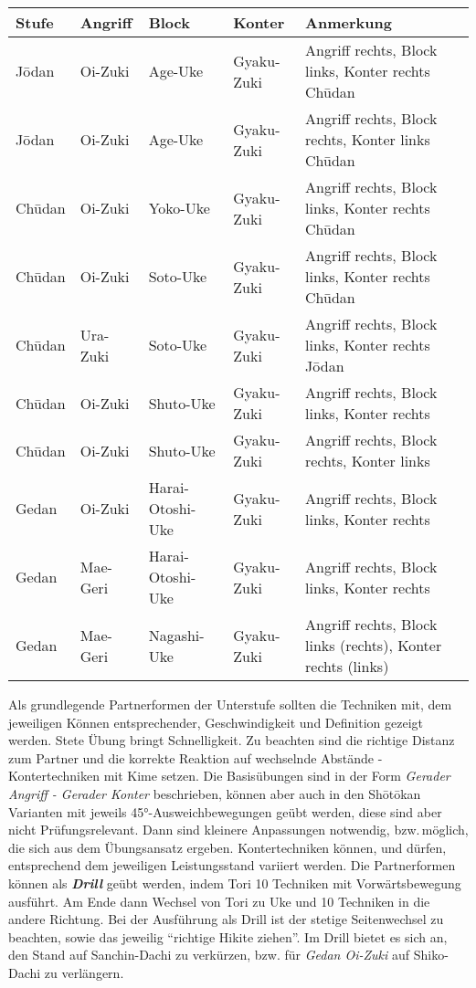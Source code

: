 	\null\vfill\null
	{\small 	\begin{tabularx}{\textwidth}{llllX}
			\textbf{Stufe} 	& \textbf{Angriff} 	& \textbf{Block}&\textbf{Konter}&Anmerkung\\
			\midrule
			J\={o}dan 	& Oi-Zuki 	& Age-Uke			&Gyaku-Zuki	& Angriff rechts, Block links, Konter rechts Ch\={u}dan \\
			J\={o}dan 	& Oi-Zuki 	& Age-Uke			&Gyaku-Zuki	& Angriff rechts, Block rechts, Konter links Ch\={u}dan \\	
			Ch\={u}dan	& Oi-Zuki	& Yoko-Uke			&Gyaku-Zuki	& Angriff rechts, Block links, Konter rechts Ch\={u}dan \\
			Ch\={u}dan	& Oi-Zuki	& Soto-Uke			&Gyaku-Zuki	& Angriff rechts, Block links, Konter rechts Ch\={u}dan \\
			Ch\={u}dan	& Ura-Zuki	& Soto-Uke			&Gyaku-Zuki	& Angriff rechts, Block links, Konter rechts J\={o}dan \\
			Ch\={u}dan	& Oi-Zuki	& Shuto-Uke			&Gyaku-Zuki	& Angriff rechts, Block links, Konter rechts \\
			Ch\={u}dan	& Oi-Zuki	& Shuto-Uke			&Gyaku-Zuki	& Angriff rechts, Block rechts, Konter links \\
			Gedan		& Oi-Zuki	& Harai-Otoshi-Uke	&Gyaku-Zuki	& Angriff rechts, Block links, Konter rechts  \\
			Gedan		& Mae-Geri	& Harai-Otoshi-Uke	&Gyaku-Zuki	& Angriff rechts, Block links, Konter rechts \\
			Gedan		& Mae-Geri	& Nagashi-Uke		&Gyaku-Zuki	& Angriff rechts, Block links (rechts), Konter rechts (links)\\
			\midrule
	\end{tabularx}}\null\vfill\null
	\begin{center}
		\parbox{\textwidth-2\tabcolsep}{\footnotesize Als grundlegende Partnerformen der Unterstufe sollten die Techniken mit, dem jeweiligen Können entsprechender, Geschwindigkeit und Definition gezeigt werden. Stete Übung bringt Schnelligkeit. Zu beachten sind die richtige Distanz zum Partner und die korrekte Reaktion auf wechselnde Abstände - Kontertechniken mit Kime setzen. Die Basisübungen sind in der Form \textit{Gerader Angriff - Gerader Konter} beschrieben, können aber auch in den Sh\={o}t\={o}kan Varianten mit jeweils 45°-Ausweichbewegungen geübt werden, diese sind aber nicht Prüfungsrelevant. Dann sind kleinere Anpassungen notwendig, bzw.\,möglich, die sich aus dem Übungsansatz ergeben. Kontertechniken können, und dürfen, entsprechend dem jeweiligen Leistungsstand variiert werden.\onehalfspacing\singlespacing
		Die Partnerformen können als \textbf{\textit{Drill}} geübt werden, indem Tori 10 Techniken mit Vorwärtsbewegung ausführt. Am Ende dann Wechsel von Tori zu Uke und 10 Techniken in die andere Richtung. Bei der Ausführung als Drill ist der stetige Seitenwechsel zu beachten, sowie das jeweilig \textquotedblleft richtige Hikite ziehen\textquotedblright. Im Drill bietet es sich an, den Stand auf Sanchin-Dachi zu verkürzen, bzw. für \textit{Gedan Oi-Zuki} auf Shiko-Dachi zu verlängern.}
		
	\end{center}\null\vfill\null